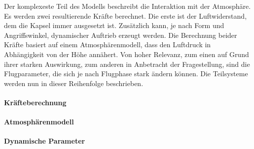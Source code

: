Der komplexeste Teil des Modells beschreibt die Interaktion mit der Atmosphäre. Es werden zwei resultierende Kräfte berechnet. Die erste ist der Luftwiderstand, dem die Kapsel immer ausgesetzt ist. Zusätzlich kann, je nach Form und Angriffswinkel, dynamischer Auftrieb erzeugt werden. Die Berechnung beider Kräfte basiert auf einem Atmosphärenmodell, dass den Luftdruck in Abhängigkeit von der Höhe annähert. Von hoher Relevanz, zum einen auf Grund ihrer starken Auswirkung, zum anderen in Anbetracht der Fragestellung, sind die Flugparameter, die sich je nach Flugphase stark ändern können. Die Teilsysteme werden nun in dieser Reihenfolge beschrieben.

\paragraph{Kräfteberechnung}
\label{atmosphere}


\paragraph{Atmosphärenmodell}


\paragraph{Dynamische Parameter}
